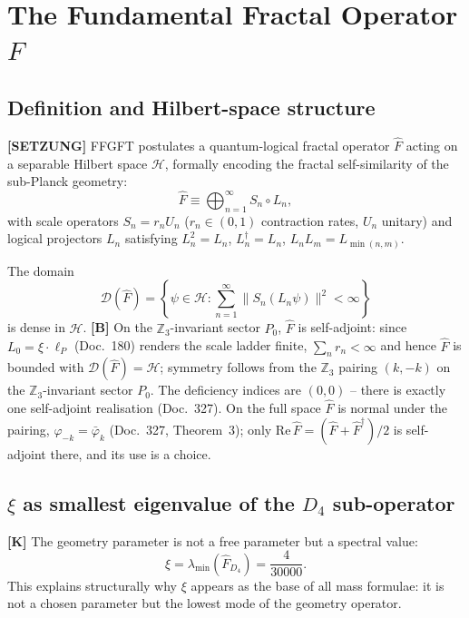 \section{The Fundamental Fractal Operator $\hat{F}$}

\subsection{Definition and Hilbert-space structure}

\textbf{[SETZUNG]} FFGFT postulates a quantum-logical fractal operator
$\hat{F}$ acting on a separable Hilbert space $\mathcal{H}$, formally
encoding the fractal self-similarity of the sub-Planck geometry:
\begin{equation}
  \hat{F} \equiv \bigoplus_{n=1}^{\infty} S_n \circ L_n,
  \label{eq:F_def}
\end{equation}
with scale operators $S_n = r_n U_n$ ($r_n \in (0,1)$ contraction
rates, $U_n$ unitary) and logical projectors $L_n$ satisfying
$L_n^2 = L_n$, $L_n^\dagger = L_n$, $L_nL_m = L_{\min(n,m)}$.

The domain
\begin{equation}
  \mathcal{D}(\hat{F}) = \left\{ \psi \in \mathcal{H} :
  \sum_{n=1}^{\infty} \|S_n(L_n\psi)\|^2 < \infty \right\}
\end{equation}
is dense in $\mathcal{H}$. \textbf{[B]} On the $\mathbb{Z}_3$-invariant sector $P_0$, $\hat{F}$ is self-adjoint:
since $L_0 = \xi\cdot\ell_P$ (Doc.~180) renders the scale ladder finite,
$\sum_n r_n < \infty$ and hence $\hat{F}$ is bounded with
$\mathcal{D}(\hat{F}) = \mathcal{H}$; symmetry follows from the
$\mathbb{Z}_3$ pairing $(k,-k)$ on the $\mathbb{Z}_3$-invariant sector $P_0$. The deficiency indices are $(0,0)$ --
there is exactly one self-adjoint realisation (Doc.~327). On the full space
$\hat{F}$ is normal under the pairing, $\varphi_{-k}=\bar\varphi_k$
(Doc.~327, Theorem~3); only $\mathrm{Re}\,\hat{F} = (\hat{F}+\hat{F}^\dagger)/2$
is self-adjoint there, and its use is a choice.

\subsection{$\xi$ as smallest eigenvalue of the $D_4$ sub-operator}

\textbf{[K]} The geometry parameter is not a free parameter but a
spectral value:
\begin{equation}
  \xi = \lambda_{\min}(\hat{F}_{D_4}) = \frac{4}{30000}.
  \label{eq:xi_eigen}
\end{equation}
This explains structurally why $\xi$ appears as the base of all mass
formulae: it is not a chosen parameter but the lowest mode of the
geometry operator.

